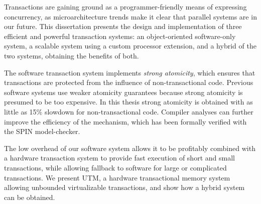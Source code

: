 {\small

Transactions are gaining ground as a programmer-friendly means of
expressing concurrency, as microarchitecture trends make it
clear that parallel systems are in our future.  This dissertation
presents the design and implementation of three efficient and powerful
transaction systems: an object-oriented software-only system, a
scalable system using a custom processor extension, and a hybrid of
the two systems, obtaining the benefits of both.

The software transaction system implements \textit{strong atomicity},
which ensures that transactions are protected from the influence of
non-transactional code.  Previous software systems use weaker
atomicity guarantees because strong atomicity is presumed to be too
expensive.  In this thesis strong atomicity is obtained with as little
as 15\% slowdown for non-transactional code.  Compiler analyses can
further improve the efficiency of the mechanism, which has been
formally verified with the SPIN model-checker.

The low overhead of our software system allows it to be profitably
combined with a hardware transaction system to provide fast execution
of short and small transactions, while allowing fallback to software
for large or complicated transactions.  We present UTM, a hardware
transactional memory system allowing unbounded virtualizable
transactions, and show how a hybrid system can be obtained.
}


